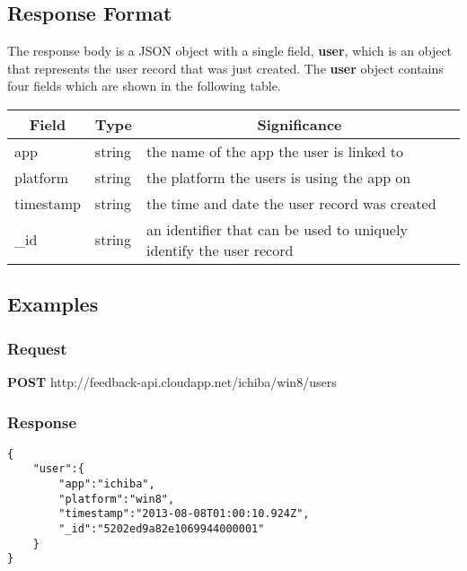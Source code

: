 \subsection{Response Format}

The response body is a JSON object with a single field, \textbf{user},
which is an object that represents the user record that was just created.
The \textbf{user} object contains four fields which are shown in the
following table.

\begin{center}
\begin{tabular}{|l||l||l|}
\hline

\multicolumn{1}{|c||}{\textbf{Field}} &
\multicolumn{1}{c||}{\textbf{Type}} &
\multicolumn{1}{c||}{\textbf{Significance}} \\

\hline
\hline

app & string & the name of the app the user is linked to \\
\hline
platform & string & the platform the users is using the app on \\
\hline
timestamp & string & the time and date the user record was created \\
\hline
\_id & string & an identifier that can be used to uniquely identify the user record \\
\hline

\end{tabular}
\end{center}


\subsection{Examples}

\subsubsection{Request}
\textbf{POST} http://feedback-api.cloudapp.net/ichiba/win8/users
\subsubsection{Response}
\begin{verbatim}
{
    "user":{
        "app":"ichiba",
        "platform":"win8",
        "timestamp":"2013-08-08T01:00:10.924Z",
        "_id":"5202ed9a82e1069944000001"
    }
}
\end{verbatim}
